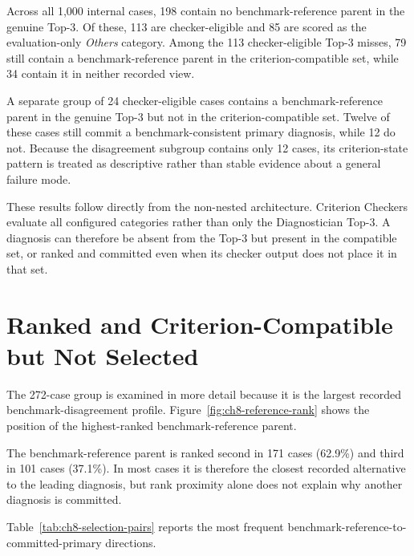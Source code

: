 Across all 1,000 internal cases, 198 contain no benchmark-reference parent in the genuine Top-3. Of these, 113 are checker-eligible and 85 are scored as the evaluation-only \emph{Others} category. Among the 113 checker-eligible Top-3 misses, 79 still contain a benchmark-reference parent in the criterion-compatible set, while 34 contain it in neither recorded view.

A separate group of 24 checker-eligible cases contains a benchmark-reference parent in the genuine Top-3 but not in the criterion-compatible set. Twelve of these cases still commit a benchmark-consistent primary diagnosis, while 12 do not. Because the disagreement subgroup contains only 12 cases, its criterion-state pattern is treated as descriptive rather than stable evidence about a general failure mode.

These results follow directly from the non-nested architecture. Criterion Checkers evaluate all configured categories rather than only the Diagnostician Top-3. A diagnosis can therefore be absent from the Top-3 but present in the compatible set, or ranked and committed even when its checker output does not place it in that set.

\section{Ranked and Criterion-Compatible but Not Selected}
\label{sec:ch8-primary-selection}

The 272-case group is examined in more detail because it is the largest recorded benchmark-disagreement profile. Figure~\ref{fig:ch8-reference-rank} shows the position of the highest-ranked benchmark-reference parent.

\FloatBarrier

The benchmark-reference parent is ranked second in 171 cases (62.9\%) and third in 101 cases (37.1\%). In most cases it is therefore the closest recorded alternative to the leading diagnosis, but rank proximity alone does not explain why another diagnosis is committed.

Table~\ref{tab:ch8-selection-pairs} reports the most frequent benchmark-reference-to-committed-primary directions.

